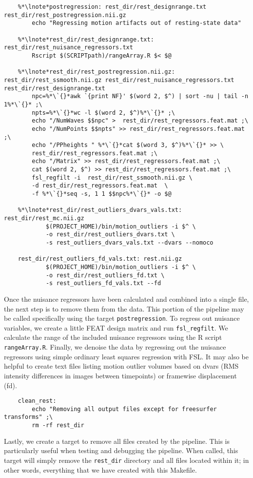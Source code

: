 \begin{lstlisting}
	%*\lnote*postregression: rest_dir/rest_designrange.txt rest_dir/rest_postregression.nii.gz
		echo "Regressing motion artifacts out of resting-state data"

	%*\lnote*rest_dir/rest_designrange.txt: rest_dir/rest_nuisance_regressors.txt
		Rscript $(SCRIPTpath)/rangeArray.R $< $@

	%*\lnote*rest_dir/rest_postregression.nii.gz: rest_dir/rest_ssmooth.nii.gz rest_dir/rest_nuisance_regressors.txt rest_dir/rest_designrange.txt
		npc=%*\`{}*awk `{print NF}' $(word 2, $^) | sort -nu | tail -n 1%*\`{}* ;\
		npts=%*\`{}*wc -l $(word 2, $^)%*\`{}* ;\
		echo "/NumWaves $$npc" >  rest_dir/rest_regressors.feat.mat ;\
		echo "/NumPoints $$npts" >> rest_dir/rest_regressors.feat.mat ;\
		echo "/PPheights " %*\`{}*cat $(word 3, $^)%*\`{}* >> \
		rest_dir/rest_regressors.feat.mat ;\
		echo "/Matrix" >> rest_dir/rest_regressors.feat.mat ;\
		cat $(word 2, $^) >> rest_dir/rest_regressors.feat.mat ;\
		fsl_regfilt -i  rest_dir/rest_ssmooth.nii.gz \
		-d rest_dir/rest_regressors.feat.mat  \
		-f %*\`{}*seq -s, 1 1 $$npc%*\`{}* -o $@
		
	%*\lnote*rest_dir/rest_outliers_dvars_vals.txt: rest_dir/rest_mc.nii.gz
			$(PROJECT_HOME)/bin/motion_outliers -i $^ \
			-o rest_dir/rest_outliers_dvars.txt \
			-s rest_outliers_dvars_vals.txt --dvars --nomoco
		
	rest_dir/rest_outliers_fd_vals.txt: rest.nii.gz
			$(PROJECT_HOME)/bin/motion_outliers -i $^ \
			-o rest_dir/rest_outliers_fd.txt \
			-s rest_outliers_fd_vals.txt --fd
\end{lstlisting}

Once the nuisance regressors have been calculated and combined into a single file, the next step is to remove them from the data.  This portion of the pipeline may be called specifically using the target \texttt{postregression}.  To regress out nuisance variables, we create a little FEAT design matrix and run \texttt{fsl_regfilt}. We calculate the range of the included nuisance regressors using the R script \texttt{rangeArray.R}.  Finally, we denoise the data by regressing out the nuisance regressors using simple ordinary least squares regression with FSL.  It may also be helpful to create text files listing motion outlier volumes based on dvars (RMS intensity differences in images between timepoints) or framewise displacement (fd). 

\begin{lstlisting}
	clean_rest:
		echo "Removing all output files except for freesurfer transforms" ;\
		rm -rf rest_dir
\end{lstlisting}

Lastly, we create a target to remove all files created by the pipeline. This is particularly useful when testing and debugging the pipeline. When called, this target will simply remove the \texttt{rest_dir} directory and all files located within it; in other words, everything that we have created with this Makefile.


